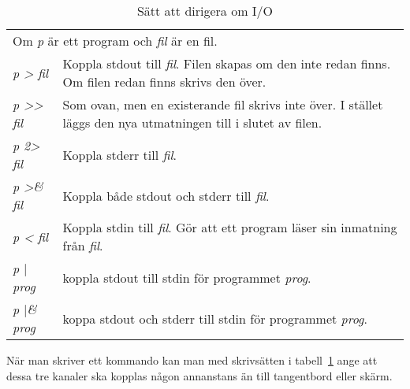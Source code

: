\documentclass[a4paper,twocolumn]{book}
\begin{document}
\begin{table}[tbp]
  \hidettindex{<}\hidettindex{>}\hidettindex{>>}%
  \begin{tabularx}{\linewidth}{|lX|}\hline
    \multicolumn{2}{|l|}{Om \emph{p} är ett program och \emph{fil} är en fil.}  \\
    \emph{p > fil}         & Koppla stdout till \emph{fil}. Filen skapas om den
    inte redan finns. Om filen redan finns skrivs den över.                     \\
    \emph{p >{}> fil}      & Som ovan, men en existerande fil skrivs inte
    över. I stället läggs den nya utmatningen till i slutet av filen.           \\
    \emph{p 2> fil}        & Koppla stderr till \emph{fil}.                     \\
    \emph{p >\& fil}       & Koppla både stdout och stderr till \emph{fil}.     \\
    \emph{p < fil}         & Koppla stdin till \emph{fil}. Gör att ett program
    läser sin inmatning från \emph{fil}.                                        \\
    \emph{p $\mid$ prog}   & koppla stdout till stdin för programmet
    \emph{prog}.                                                                \\
    \emph{p $\mid$\& prog} & koppa stdout och stderr till stdin för programmet
    \emph{prog}.                                                                \\
    \hline
  \end{tabularx}
  \caption{Sätt att dirigera om I/O}
  \label{tab:io-redir}
\end{table}

När man skriver ett kommando kan man med skrivsätten i
tabell~\ref{tab:io-redir} ange att dessa tre kanaler ska kopplas någon
annanstans än till tangentbord eller skärm.
\end{document}
